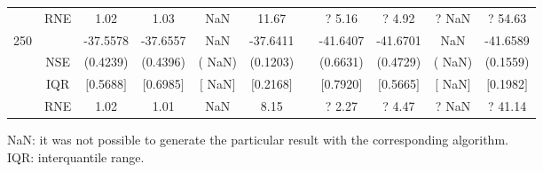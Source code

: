 \begin{table}[h]
\begin{tabular}{cc cccc c cccc}
  & RNE &   1.02 &   1.03 &    NaN &  11.67 &  &?   5.16 & ?   4.92  & ?    NaN & ?  54.63   \\ [1ex] 
250 & & -37.5578 & -37.6557 &    NaN & -37.6411 & & -41.6407 & -41.6701 &    NaN & -41.6589  \\ 
  & NSE & (0.4239) & (0.4396) & (   NaN) & (0.1203) & & (0.6631) & (0.4729) & (   NaN) & (0.1559)   \\ 
  & IQR & $[$0.5688$]$ & $[$0.6985$]$ & $[$   NaN$]$ & $[$0.2168$]$ & & $[$0.7920$]$ & $[$0.5665$]$ & $[$   NaN$]$ & $[$0.1982$]$  \\  
  & RNE &   1.02 &   1.01 &    NaN &   8.15 &  &?   2.27 & ?   4.47  & ?    NaN & ?  41.14   \\ [1ex] 
\hline 
\end{tabular} 
\raggedright 

\vspace{5pt}\footnotesize{NaN: it was not possible to generate the particular result with the corresponding algorithm.} \\ 
\vspace{5pt}\footnotesize{IQR: interquantile range.} 
\end{table} 
